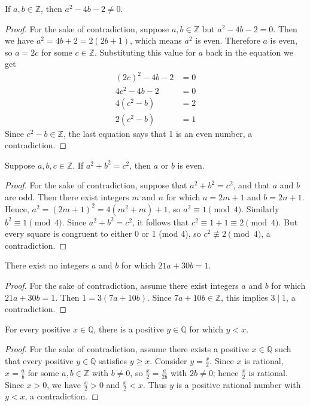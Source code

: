 \documentclass[DIN, pagenumber=false, fontsize=11pt, parskip=half]{scrartcl}
\begin{document}
\begin{problems}
    \problem If $a,b \in \mathbb{Z}$, then $a^2-4b-2 \neq 0$.
    \begin{proof}
        For the sake of contradiction, suppose $a,b \in \mathbb{Z}$ but $a^2-4b-2 = 0$.
        Then we have $a^2 = 4b + 2 = 2(2b + 1)$, which means $a^2$ is even. Therefore $a$ is even, so $a = 2c$ for some $c \in \mathbb{Z}$.
        Substituting this value for $a$ back in the equation we get
        \begin{align*}
            (2c)^2 - 4b - 2 & = 0\\
            4c^2 - 4b - 2 & = 0\\ 
            4(c^2-b) & = 2\\ 
            2(c^2-b) & = 1
        \end{align*}
        Since $c^2 - b \in \mathbb{Z}$, the last equation says that 1 is an even number, a contradiction.
    \end{proof}

    \problem Suppose $a,b,c \in \mathbb{Z}$. If $a^2 + b^2 = c^2$, then $a$ or $b$ is even.
    \begin{proof}
        For the sake of contradiction, suppose that $a^2 + b^2 = c^2$, and that $a$ and $b$ are odd.
        Then there exist integers $m$ and $n$ for which $a = 2m + 1$ and $b = 2n + 1$.
        Hence, $a^2 = (2m + 1)^2 = 4(m^2 + m) + 1$, so $a^2 \equiv 1 \pmod{4}$. Similarly $b^2 \equiv 1 \pmod{4}$.
        Since $a^2 + b^2 = c^2$, it follows that $c^2 \equiv 1 + 1 \equiv 2 \pmod{4}$.
        But every square is congruent to either 0 or 1 (mod 4), so $c^2 \not\equiv 2 \pmod{4}$, a contradiction.
    \end{proof}

    \problem There exist no integers $a$ and $b$ for which $21a + 30b = 1$.
    \begin{proof}
        For the sake of contradiction, assume there exist integers $a$ and $b$ for which $21a + 30b = 1$. 
        Then $1 = 3(7a + 10b)$. Since $7a + 10b \in \mathbb{Z}$, this implies $3 \mid 1$, a contradiction.
    \end{proof}

    \problem For every positive $x \in \mathbb{Q}$, there is a positive $y \in \mathbb{Q}$ for which $y < x$.
    \begin{proof}
        For the sake of contradiction, assume there exists a positive $x \in \mathbb{Q}$ such that every positive $y \in \mathbb{Q}$ satisfies $y \geq x$.
        Consider $y = \frac{x}{2}$.
        Since $x$ is rational, $x = \frac{a}{b}$ for some $a,b \in \mathbb{Z}$ with $b \neq 0$, so $\frac{x}{2} = \frac{a}{2b}$ with $2b \neq 0$; hence $\frac{x}{2}$ is rational.
        Since $x > 0$, we have $\frac{x}{2} > 0$ and $\frac{x}{2} < x$.
        Thus $y$ is a positive rational number with $y < x$, a contradiction.
    \end{proof}


\end{problems}
\end{document}
